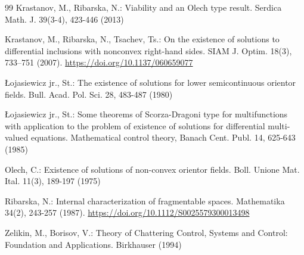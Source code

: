 \documentclass[a4paper]{article}
\begin{document}
\begin{thebibliography}{99}
 Krastanov, M., Ribarska, N.: Viability and an Olech type result. Serdica Math. J. 39(3-4), 423-446 (2013)

 Krastanov, M., Ribarska, N., Tsachev, Ts.: On the existence
of solutions to differential inclusions with nonconvex right-hand sides. SIAM
J. Optim. 18(3), 733–751 (2007). \url{https://doi.org/10.1137/060659077}

 Łojasiewicz jr., St.: The existence of solutions for lower semicontinuous orientor fields. Bull. Acad. Pol. Sci. 28, 483-487 (1980)

 Łojasiewicz jr., St.: Some theorems of Scorza-Dragoni type for multifunctions with application to the problem of existence of solutions for differential multi-valued equations. Mathematical control theory, Banach Cent. Publ. 14, 625-643 (1985)

 Olech, C.: Existence of solutions of non-convex orientor fields. Boll. Unione Mat. Ital. 11(3), 189-197 (1975)

 Ribarska, N.: Internal characterization of fragmentable spaces. Mathematika 34(2), 243-257 (1987). \url{https://doi.org/10.1112/S0025579300013498}

 Zelikin, M., Borisov, V.: Theory of Chattering Control, Systems and Control: Foundation and Applications. Birkhauser (1994)

\end{thebibliography}
\end{document}
